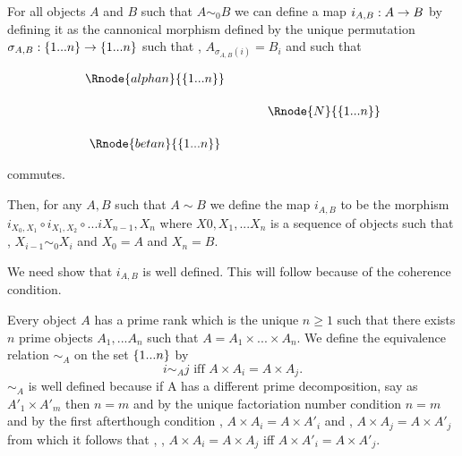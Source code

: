 \documentclass[10pt,a4paper]{scrartcl}
\begin{document}
\begin{notebox}
For all objects $A$ and $B$ such
that $A \sim_0 B$ we can define a map $i_{A,B}: A \rightarrow B$ by defining it as the cannonical
morphism defined by the unique permutation $\sigma_{A,B} : \left\{1...n\right\} \rightarrow \left\{1...n\right\}$ 
such that \foreachi, $A_{\sigma_{A,B}(i)}=B_i$ and such that
\begin{center}
\begin{equation}
\label{preservingcopynumber}
\begin{array}{cp{.5cm}c}
\Rnode{alphan}{\set{\n}}  &&              \\ [0.5cm]
												  && \Rnode{N}{\set{\n}} \\ [0.5cm]
\Rnode{betan}{\set{\n}}   &&            
\end{array}
\end{equation}
\end{center}
commutes. 
\end{notebox}
\begin{notebox}
Then, for any $A,B$ such that $A \sim B$ we define the map $i_{A,B}$ to be the morphism
$i_{X_0,X_1} \circ i_{X_1,X_2} \circ ... i{X_{n-1},X_n}$ where $X0,X_1,...X_n$ is a sequence
of objects such that \foreachi, $X_{i-1} \sim_0 X_i$ and $X_0=A$ and $X_n=B$. 

We need show that $i_{A,B}$ is well defined. This will follow because of the coherence
condition. 
\end{notebox}

\begin{definition}
Every object $A$ has a prime rank which is the unique $n \geq 1$ such that
there exists $n$ prime objects $A_1,...A_n$ such that $A=A_1 \times ... \times A_n$.
We define the equivalence relation $\sim_A$ on the set $\left\{1...n\right\}$ by
\begin{equation*}
i \sim_A j \mbox{ iff } A \times A_i = A \times A_j.
\end{equation*}
$\sim_A$ is well defined because if A has a different prime decomposition, say as 
$A'_1 \times A'_m$ then $n=m$ and by the unique factoriation number condition $n=m$
and by the first afterthough condition \foreachi, 
$A \times A_i = A \times A'_i$
and \foreachj, 
$A \times A_j = A \times A'_j$
from which it follows that \foreachi, \foreachj,
$A \times A_i = A \times A_j $ iff $A \times A'_i = A \times A'_j $.
\end{definition}
\end{document}
